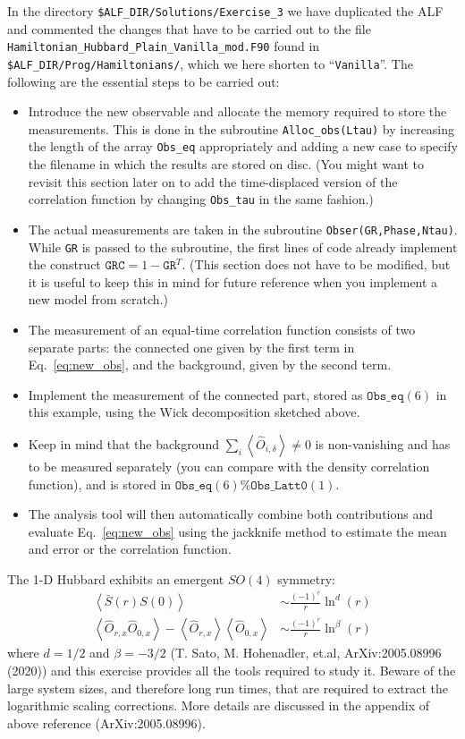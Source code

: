 \documentclass[10pt,modern]{scrartcl}
\numberwithin{exerciseitem}{exercise} %
\begin{document}
In the directory  \texttt{\$ALF\_DIR/Solutions/Exercise\_3} we have  duplicated the ALF and commented  the changes that have to be carried out to the file \texttt{Hamiltonian\_Hubbard\_Plain\_Vanilla\_mod.F90} found in \texttt{\$ALF\_DIR/Prog/Hamiltonians/}, which we here shorten to ``\texttt{Vanilla}''. The following are the essential steps to be carried out:
\begin{itemize}
	\item  Introduce the new observable and allocate the memory required to store the measurements. This is done in the subroutine \texttt{Alloc\_obs(Ltau)} by increasing the length of the array \texttt{Obs\_eq} appropriately and adding a new case to specify the filename in which the results are stored on disc. (You might want to revisit this section later on to add the time-displaced version of the correlation function by changing \texttt{Obs\_tau} in the same fashion.)
	\item  The actual measurements are taken in the subroutine \texttt{Obser(GR,Phase,Ntau)}. While \texttt{GR} is passed to the subroutine, the first lines of code already implement the construct $\mathtt{GRC}=1-\mathtt{GR}^T$. (This section does not have to be modified, but it is useful to keep this in mind for future reference when you implement a new model from scratch.)
	\item The measurement of an equal-time correlation function consists of two separate parts: the connected one given by the first term in Eq.~\ref{eq:new_obs}, and the background, given by the second term.
	\item Implement the measurement of the connected part, stored as $\mathtt{Obs\_eq}(6)$ in this example, using the Wick decomposition sketched above.
	\item Keep in mind that the background $\sum_i\left\langle \hat{O}_{i,\delta} \right\rangle\neq0$ is non-vanishing and has to be measured separately (you can compare with the density correlation function), and is stored in $\mathtt{Obs\_eq}(6)\%\mathtt{Obs\_Latt0}(1)$.
	\item The analysis tool will then automatically combine both contributions and evaluate Eq.~\ref{eq:new_obs} using the jackknife method to estimate the mean and error or the correlation function.
\end{itemize}

The 1-D Hubbard exhibits an emergent $SO(4)$ symmetry:
\begin{align}
\left\langle \bar{S}(r)S(0) \right\rangle  &\sim  \frac{(-1)^r}{r}\ln^d(r)\\
\left\langle \hat{O}_{r,x} \hat{O}_{0,x} \right\rangle  -  \left\langle \hat{O}_{r,x} \right\rangle \left\langle \hat{O}_{0,x} \right\rangle  &\sim   \frac{(-1)^r}{r}\ln^\beta(r)
\end{align}
where $d=1/2$ and $\beta=-3/2$ (T. Sato, M. Hohenadler, et.al, ArXiv:2005.08996 (2020)) and this exercise provides all the tools required to study it. Beware of the large system sizes, and therefore long run times, that are required to extract the logarithmic scaling corrections. More details are discussed in the appendix of above reference (ArXiv:2005.08996).
\end{document}
